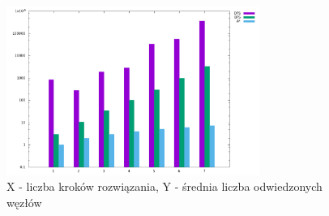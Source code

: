 \documentclass{classrep}
\begin{document}
{{            \begin{figure}[!htbp]
                \centering
                \includegraphics[width=\textwidth, height=55mm]{img/CMN_visited.png}
                \caption{X - liczba kroków rozwiązania, Y - średnia liczba odwiedzonych węzłów}
                \label{CMN_visited}
            \end{figure}
            \FloatBarrier
        }
    }
\end{document}
